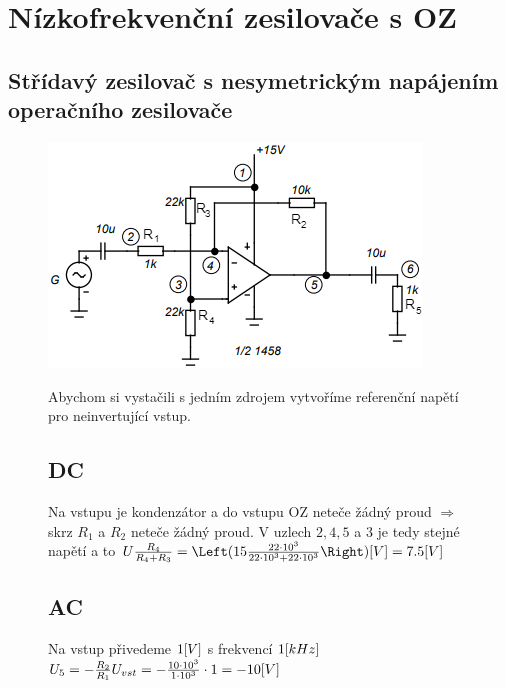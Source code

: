 \documentclass{article}
\begin{document}
\section{Nízkofrekvenční zesilovače s OZ}
\subsection*{Střídavý zesilovač s nesymetrickým napájením operačního zesilovače}
\begin{figure}[H]
  \begin{minipage}[t]{0.48\textwidth}
    \vspace{10mm}
    \includegraphics[width=\textwidth]{uvod/posun.png}
  \end{minipage}
  \hfill
  \begin{minipage}[t]{0.48\textwidth}
    Abychom si vystačili s jedním zdrojem vytvoříme referenční napětí pro neinvertující vstup.

    \subsection{DC}
      Na vstupu je kondenzátor a do vstupu OZ neteče žádný proud \(\Rightarrow\) skrz \(R_1\) a \(R_2\) neteče žádný proud.
      V uzlech \(2, 4, 5\) a \(3\) je tedy stejné napětí a to \(U\frac{R_4}{R_4 + R_3} = \Left(15\frac{22\cdot10^{3}}{22\cdot10^{3}+22\cdot10^{3}} \Right) \-[V]= 7.5\-[V]\)
    \subsection{AC} 
      Na vstup přivedeme \(1\-[V]\) s frekvencí \(1\-[kHz]\)
      \(
        U_{5} = -\frac{R_2}{R_1} U_{vst} = -\frac{10\cdot10^{3}}{1\cdot10^{3}} \cdot 1 = -10\-[V]
      \)    
  \end{minipage}
\end{figure}
\end{document}
